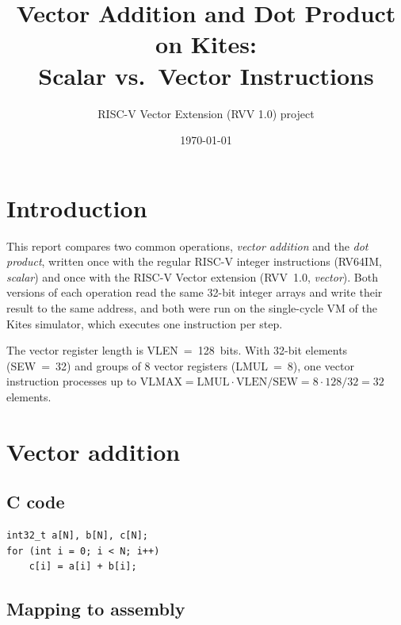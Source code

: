 \documentclass[11pt,a4paper]{article}
\title{Vector Addition and Dot Product on Kites:\\ Scalar vs.\ Vector Instructions}
\author{RISC-V Vector Extension (RVV 1.0) project}
\date{\today}
\begin{document}
\maketitle

\section{Introduction}

This report compares two common operations, \emph{vector addition} and the \emph{dot product},
written once with the regular RISC-V integer instructions (RV64IM, \emph{scalar}) and once
with the RISC-V Vector extension (RVV~1.0, \emph{vector}). Both versions of each operation read
the same 32-bit integer arrays and write their result to the same address, and both were run on
the single-cycle VM of the Kites simulator, which executes one instruction per step.

The vector register length is VLEN~=~128~bits. With 32-bit elements (SEW~=~32) and groups of 8
vector registers (LMUL~=~8), one vector instruction processes up to
$\mathrm{VLMAX} = \mathrm{LMUL}\cdot\mathrm{VLEN}/\mathrm{SEW} = 8\cdot128/32 = 32$ elements.

\section{Vector addition}

\subsection{C code}

\begin{lstlisting}[style=c]
int32_t a[N], b[N], c[N];
for (int i = 0; i < N; i++)
    c[i] = a[i] + b[i];
\end{lstlisting}

\subsection{Mapping to assembly}
\end{document}
